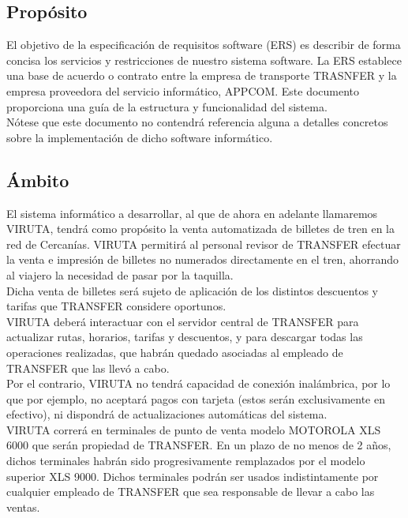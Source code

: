 \subsection{Propósito}

El objetivo de la especificación de requisitos software (ERS) es describir de forma concisa los servicios y restricciones de nuestro sistema software. La ERS establece una base de acuerdo o contrato entre la empresa de transporte TRASNFER y la empresa proveedora del servicio informático, APPCOM. Este documento proporciona una guía de la estructura y funcionalidad del sistema.\\

Nótese que este documento no contendrá referencia alguna a detalles concretos sobre la implementación de dicho software informático.

\subsection{Ámbito}

El sistema informático a desarrollar, al que de ahora en adelante llamaremos VIRUTA, tendrá como propósito la venta automatizada de billetes de tren en la red de Cercanías. VIRUTA permitirá al personal revisor de TRANSFER efectuar la venta e impresión de billetes no numerados directamente en el tren, ahorrando al viajero la necesidad de pasar por la taquilla.\\

Dicha venta de billetes será sujeto de aplicación de los distintos descuentos y tarifas que TRANSFER considere oportunos.\\

VIRUTA deberá interactuar con el servidor central de TRANSFER para actualizar rutas, horarios, tarifas y descuentos, y para descargar todas las operaciones realizadas, que habrán quedado asociadas al empleado de TRANSFER que las llevó a cabo.\\

Por el contrario, VIRUTA no tendrá capacidad de conexión inalámbrica, por lo que por ejemplo, no aceptará pagos con tarjeta (estos serán exclusivamente en efectivo), ni dispondrá de actualizaciones automáticas del sistema.\\

\color{red} VIRUTA correrá en terminales de punto de venta modelo MOTOROLA XLS 6000 que serán propiedad de TRANSFER. En un plazo de no menos de 2 años, dichos terminales habrán sido progresivamente remplazados por el modelo superior XLS 9000. Dichos terminales podrán ser usados indistintamente por cualquier empleado de TRANSFER que sea responsable de llevar a cabo las ventas. \color{black} \\



